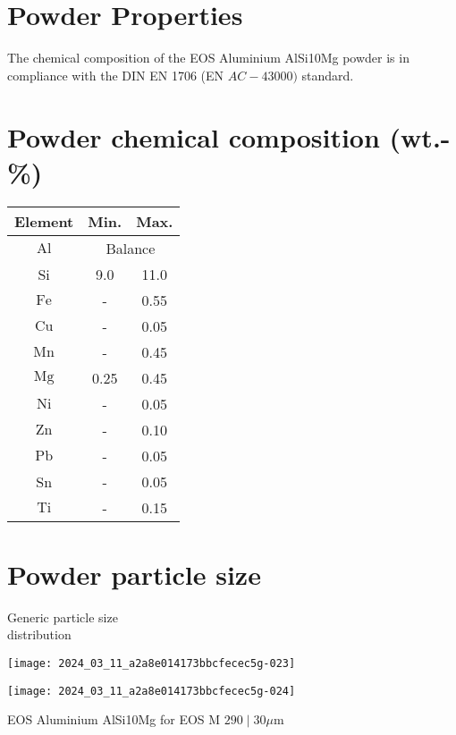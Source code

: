 \documentclass[10pt]{article}
\begin{document}
\section*{Powder Properties}
The chemical composition of the EOS Aluminium AlSi10Mg powder is in compliance with the DIN EN 1706 (EN $A C-43000)$ standard.

\section*{Powder chemical composition (wt.-\%)}
\begin{center}
\begin{tabular}{|c|c|c|}
\hline
Element & Min. & Max. \\
\hline
$\mathrm{Al}$ & \multicolumn{2}{|c|}{Balance} \\
\hline
Si & 9.0 & 11.0 \\
\hline
$\mathrm{Fe}$ & - & 0.55 \\
\hline
$\mathrm{Cu}$ & - & 0.05 \\
\hline
$\mathrm{Mn}$ & - & 0.45 \\
\hline
$\mathrm{Mg}$ & 0.25 & 0.45 \\
\hline
$\mathrm{Ni}$ & - & 0.05 \\
\hline
$\mathrm{Zn}$ & - & 0.10 \\
\hline
$\mathrm{Pb}$ & - & 0.05 \\
\hline
Sn & - & 0.05 \\
\hline
$\mathrm{Ti}$ & - & 0.15 \\
\hline
\end{tabular}
\end{center}

\section*{Powder particle size}
Generic particle size\\
distribution

\begin{center}
\texttt{[image: 2024\_03\_11\_a2a8e014173bbcfecec5g-023]}
\end{center}

\begin{center}
\texttt{[image: 2024\_03\_11\_a2a8e014173bbcfecec5g-024]}
\end{center}

EOS Aluminium AlSi10Mg for EOS M $290 \mid 30 \mu \mathrm{m}$
\end{document}
